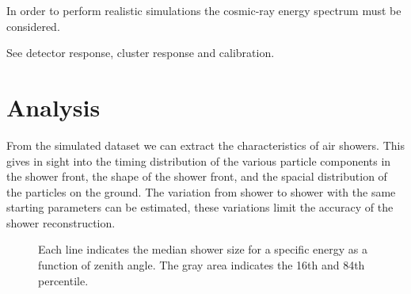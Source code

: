 In order to perform realistic simulations the cosmic-ray energy spectrum
must be considered.



See detector response, cluster response and calibration.


\section{Analysis}

From the simulated dataset we can extract the characteristics of air showers. This gives in sight into the timing distribution of the various particle components in the shower front, the shape of the shower front, and the spacial distribution of the particles on the ground. The variation from shower to shower with the same starting parameters can be estimated, these variations limit the accuracy of the shower reconstruction.

\begin{figure}
    \centering
    
    \caption{
             Each line indicates the median shower size for a specific
             energy as a function of zenith angle. The gray area
             indicates the 16th and 84th percentile.}
    \label{fig:simulations_shower_sizes}
\end{figure}
